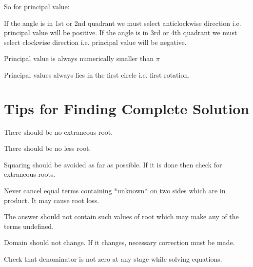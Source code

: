 So for principal value:
\startitemize[n]
\item If the angle is in 1st or 2nd quadrant we must select anticlockwise direction i.e. principal value will be positive. If the
  angle is in 3rd or 4th quadrant we must select clockwise direction i.e. principal value will be negative.
\item Principal value is always numerically smaller than $\pi$
\item Principal values always lies in the first circle i.e. first rotation.
\stopitemize

\section{Tips for Finding Complete Solution}
\startitemize[n]
\item There should be no extraneous root.
\item There should be no less root.
\item Squaring should be avoided as far as possible. If it is done then check for extraneous roots.
\item Never cancel equal terms containing *unknown* on two sides which are in product. It may cause root loss.
\item The answer should not contain such values of root which may make any of the terms undefined.
\item Domain should not change. If it changes, necessary correction must be made.
\item Check that denominator is not zero at any stage while solving equations.
\stopitemize

